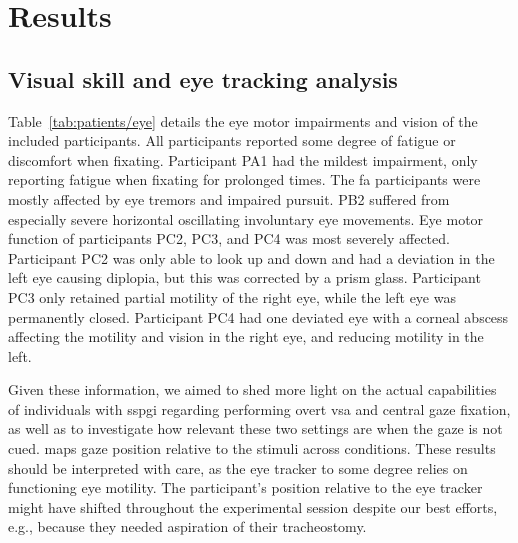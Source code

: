 \section{Results}



\subsection{Visual skill and eye tracking analysis}
\label{sec:patients/outcomes/gaze}

Table~\ref{tab:patients/eye} details the eye motor impairments and vision of
the included participants.
All participants reported some degree of fatigue or discomfort when fixating.
Participant PA1 had the mildest impairment, only reporting fatigue when fixating
for prolonged times.
The \ac{fa} participants were mostly affected by eye tremors and impaired pursuit.
PB2 suffered from especially severe horizontal oscillating involuntary eye
movements.
Eye motor function of participants PC2, PC3, and PC4 was most severely affected.
Participant PC2 was only able to look up and down and had a deviation in the
left eye causing diplopia, but this was corrected by a prism glass.
Participant PC3 only retained partial motility of the right eye, while the left eye was permanently closed.
Participant PC4 had one deviated eye with a corneal abscess affecting the motility
and vision in the right eye, and reducing motility in the left.


Given these information, we aimed to shed more light on the actual capabilities of individuals
with \ac{sspgi} regarding performing overt \ac{vsa} and central gaze
fixation, as well as to investigate how relevant these two settings are when the
gaze is not cued.
 maps gaze position relative to the stimuli
across conditions.
These results should be interpreted with care, as the eye tracker to some
degree relies on functioning eye motility.
The participant's position relative to the eye tracker might have shifted
throughout the experimental session despite our best efforts, e.g., because they needed aspiration of their
tracheostomy.


